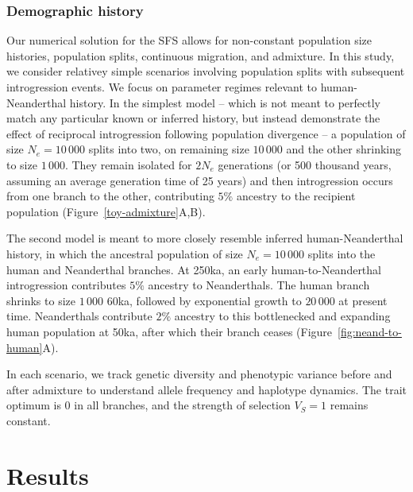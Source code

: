 \documentclass{article}
\begin{document}
\subsubsection*{Demographic history}

Our numerical solution for the SFS allows for non-constant population size
histories, population splits, continuous migration, and admixture. In this
study, we consider relativey simple scenarios involving population splits with
subsequent introgression events. We focus on parameter regimes relevant to
human-Neanderthal history. In the simplest model -- which is not meant to
perfectly match any particular known or inferred history, but instead
demonstrate the effect of reciprocal introgression following population
divergence -- a population of size $N_e=10\,000$ splits into two, on remaining
size $10\,000$ and the other shrinking to size $1\,000$. They remain isolated
for $2N_e$ generations (or 500 thousand years, assuming an average generation
time of 25 years) and then introgression occurs from one branch to the other,
contributing $5\%$ ancestry to the recipient population
(Figure~\ref{toy-admixture}A,B).

The second model is meant to more closely resemble inferred human-Neanderthal
history, in which the ancestral population of size $N_e=10\,000$ splits into
the human and Neanderthal branches. At 250ka, an early human-to-Neanderthal
introgression contributes $5\%$ ancestry to Neanderthals. The human branch
shrinks to size $1\,000$ 60ka, followed by exponential growth to $20\,000$ at
present time. Neanderthals contribute $2\%$ ancestry to this bottlenecked and
expanding human population at 50ka, after which their branch ceases
(Figure~\ref{fig:neand-to-human}A).

In each scenario, we track genetic diversity and phenotypic variance before and
after admixture to understand allele frequency and haplotype dynamics. The
trait optimum is $0$ in all branches, and the strength of selection $V_S=1$
remains constant.

\section*{Results}
\end{document}
